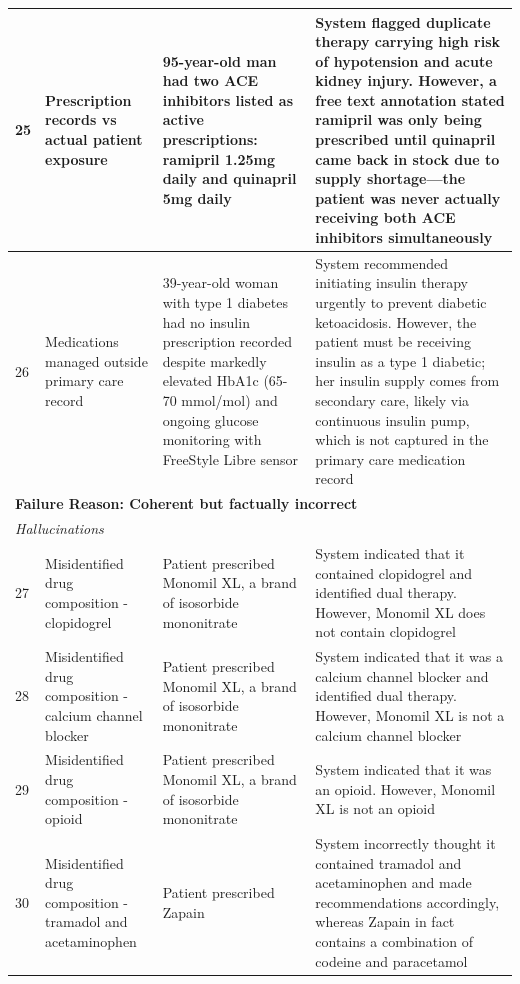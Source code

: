 {\begin{longtable}{p{}p{}p{}p{}}
                \midrule
                \hypertarget{vignette-25}{25} & Prescription records vs actual patient exposure & 95-year-old man had two ACE inhibitors listed as active prescriptions: ramipril 1.25mg daily and quinapril 5mg daily & System flagged duplicate therapy carrying high risk of hypotension and acute kidney injury. However, a free text annotation stated ramipril was only being prescribed until quinapril came back in stock due to supply shortage—the patient was never actually receiving both ACE inhibitors simultaneously \\
                \midrule
                \hypertarget{vignette-26}{26} & Medications managed outside primary care record & 39-year-old woman with type 1 diabetes had no insulin prescription recorded despite markedly elevated HbA1c (65-70 mmol/mol) and ongoing glucose monitoring with FreeStyle Libre sensor & System recommended initiating insulin therapy urgently to prevent diabetic ketoacidosis. However, the patient must be receiving insulin as a type 1 diabetic; her insulin supply comes from secondary care, likely via continuous insulin pump, which is not captured in the primary care medication record \\
                \midrule
                \multicolumn{4}{l}{\textbf{Failure Reason: Coherent but factually incorrect}} \\
                \midrule
                \multicolumn{4}{l}{\textit{Hallucinations}} \\
                \midrule
                \hypertarget{vignette-27}{27} & Misidentified drug composition - clopidogrel & Patient prescribed Monomil XL, a brand of isosorbide mononitrate & System indicated that it contained clopidogrel and identified dual therapy. However, Monomil XL does not contain clopidogrel \\
                \midrule
                \hypertarget{vignette-28}{28} & Misidentified drug composition - calcium channel blocker & Patient prescribed Monomil XL, a brand of isosorbide mononitrate & System indicated that it was a calcium channel blocker and identified dual therapy. However, Monomil XL is not a calcium channel blocker \\
                \midrule
                \hypertarget{vignette-29}{29} & Misidentified drug composition - opioid & Patient prescribed Monomil XL, a brand of isosorbide mononitrate & System indicated that it was an opioid. However, Monomil XL is not an opioid \\
                \midrule
                \hypertarget{vignette-30}{30} & Misidentified drug composition - tramadol and acetaminophen & Patient prescribed Zapain & System incorrectly thought it contained tramadol and acetaminophen and made recommendations accordingly, whereas Zapain in fact contains a combination of codeine and paracetamol \\

\end{longtable}}
